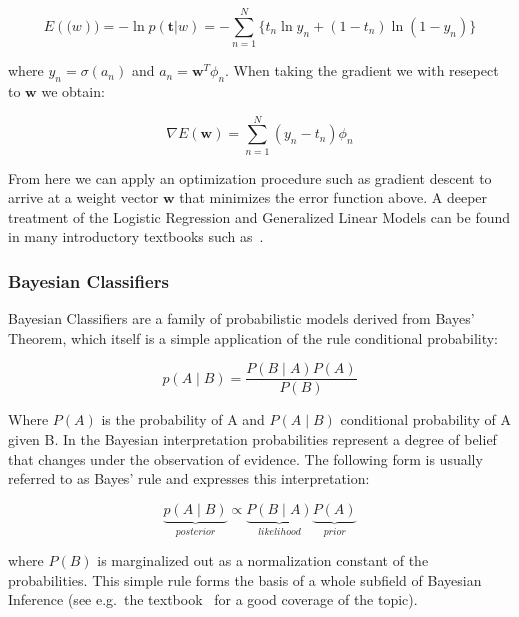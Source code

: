 \begin{equation}
  E(\mathbf(w)) = - \ln p(\mathbf{t} | w) = - \sum_{n=1}^N \{ t_n \ln y_n + (1 - t_n) \ln (1-y_n) \}
\end{equation}

where $y_n = \sigma(a_n)$ and $a_n = \mathbf{w}^T \phi_n$. When taking the gradient we with resepect to $\mathbf{w}$ we obtain:

\begin{equation}
  \nabla E(\mathbf{w}) = \sum_{n=1}^N (y_n - t_n) \phi_n
\end{equation}

From here we can apply an optimization procedure such as gradient descent to arrive at a weight vector $\mathbf{w}$ that minimizes the error function above. A deeper treatment of the Logistic Regression and Generalized Linear Models can be found in many introductory textbooks such as~\cite[Chapter 4.3.2, p.~205]{Bishop:2006aa}.


\subsubsection{Bayesian Classifiers}
\label{subs:Bayesian Classifiers}

Bayesian Classifiers are a family of probabilistic models derived from Bayes' Theorem, which itself is a simple application of the rule conditional probability:

\begin{equation}
  p(A \mid B) = \frac{P(B \mid A) P(A)}{P(B)}
\end{equation}

Where $P(A)$ is the probability of A and $P(A \mid B)$ conditional probability of A given B. In the Bayesian interpretation probabilities represent a degree of belief that changes under the observation of evidence. The following form is usually referred to as Bayes' rule and expresses this interpretation:

\begin{equation}
  \underbrace{p(A \mid B)}_{posterior}  \propto \underbrace{P(B \mid A)}_{likelihood} \underbrace{P(A)}_{prior}
\end{equation}

where $P(B)$ is marginalized out as a normalization constant of the probabilities. This simple rule forms the basis of a whole subfield of Bayesian Inference (see e.g.\ the textbook~\cite{Barber:2012aa} for a good coverage of the topic).

